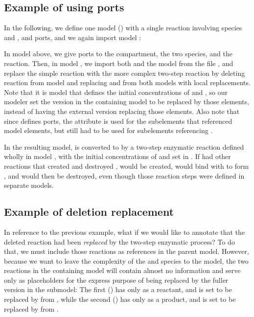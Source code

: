 \subsection{Example of using ports}

In the following, we define one model () with a single reaction involving species  and , and ports, and we again import model :


In model  above, we give ports to the compartment, the two species, and the reaction.  Then, in model , we import both  and the model  from the file , and replace the simple reaction with the more complex two-step reaction by deleting reaction  from model  and replacing  and  from both models with local replacements.  Note that it is model  that defines the initial concentrations of  and , so our modeler set the  version in the containing model to be replaced by those elements, instead of  having the external version replacing those elements.  Also note that since  defines ports, the  attribute is used for the subelements that referenced  model elements, but  still had to be used for subelements referencing .

In the resulting model,  is converted to  by a two-step enzymatic reaction defined wholly in model , with the initial concentrations of  and  set in .  If  had other reactions that created  and destroyed ,  would be created, would bind with  to form , and  would then be destroyed, even though those reaction steps were defined in separate models.


\subsection{Example of deletion replacement}

In reference to the previous example, what if we would like to annotate that the deleted reaction had been \emph{replaced} by the two-step enzymatic process?  To do that, we must include those reactions as  references in the parent model.  However, because we want to leave the complexity of the   and  species to the  model, the two reactions in the containing model will contain almost no information and serve only as placeholders for the express purpose of being replaced by the fuller version in the  submodel:  The first () has only  as a reactant, and is set to be replaced by  from , while the second () has only  as a  product, and is set to be replaced by  from .

